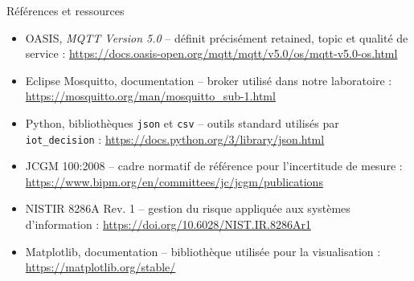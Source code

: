 \documentclass[aspectratio=169]{beamer}
\begin{document}
\begin{frame}{Références et ressources}
  \tiny
  \begin{itemize}
    \item OASIS, \emph{MQTT Version 5.0} -- définit précisément retained, topic et qualité de service : \url{https://docs.oasis-open.org/mqtt/mqtt/v5.0/os/mqtt-v5.0-os.html}
    \item Eclipse Mosquitto, documentation -- broker utilisé dans notre laboratoire : \url{https://mosquitto.org/man/mosquitto_sub-1.html}
    \item Python, bibliothèques \texttt{json} et \texttt{csv} -- outils standard utilisés par \texttt{iot\_decision} : \url{https://docs.python.org/3/library/json.html}
    \item JCGM 100:2008 -- cadre normatif de référence pour l'incertitude de mesure : \url{https://www.bipm.org/en/committees/jc/jcgm/publications}
    \item NISTIR 8286A Rev. 1 -- gestion du risque appliquée aux systèmes d'information : \url{https://doi.org/10.6028/NIST.IR.8286Ar1}
    \item Matplotlib, documentation -- bibliothèque utilisée pour la visualisation : \url{https://matplotlib.org/stable/}
  \end{itemize}
\end{frame}
\end{document}
